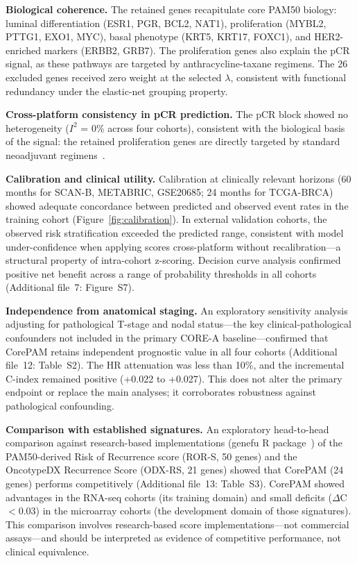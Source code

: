 \documentclass[referee,lineno,pdflatex,sn-vancouver-num]{sn-jnl}
\begin{document}
\textbf{Biological coherence.} The retained genes recapitulate core PAM50 biology: luminal differentiation (ESR1, PGR, BCL2, NAT1), proliferation (MYBL2, PTTG1, EXO1, MYC), basal phenotype (KRT5, KRT17, FOXC1), and HER2-enriched markers (ERBB2, GRB7). The proliferation genes also explain the pCR signal, as these pathways are targeted by anthracycline-taxane regimens. The 26 excluded genes received zero weight at the selected $\lambda$, consistent with functional redundancy under the elastic-net grouping property.

\textbf{Cross-platform consistency in pCR prediction.} The pCR block showed no heterogeneity ($I^2$ = 0\% across four cohorts), consistent with the biological basis of the signal: the retained proliferation genes are directly targeted by standard neoadjuvant regimens~\cite{prat2015}.

\textbf{Calibration and clinical utility.} Calibration at clinically relevant horizons (60 months for SCAN-B, METABRIC, GSE20685; 24 months for TCGA-BRCA) showed adequate concordance between predicted and observed event rates in the training cohort (Figure~\ref{fig:calibration}). In external validation cohorts, the observed risk stratification exceeded the predicted range, consistent with model under-confidence when applying scores cross-platform without recalibration---a structural property of intra-cohort z-scoring. Decision curve analysis confirmed positive net benefit across a range of probability thresholds in all cohorts (Additional file~7: Figure~S7).

\textbf{Independence from anatomical staging.} An exploratory sensitivity analysis adjusting for pathological T-stage and nodal status---the key clinical-pathological confounders not included in the primary CORE-A baseline---confirmed that CorePAM retains independent prognostic value in all four cohorts (Additional file~12: Table~S2). The HR attenuation was less than 10\%, and the incremental C-index remained positive (+0.022 to +0.027). This does not alter the primary endpoint or replace the main analyses; it corroborates robustness against pathological confounding.

\textbf{Comparison with established signatures.} An exploratory head-to-head comparison against research-based implementations (genefu R package~\cite{gendoo2016}) of the PAM50-derived Risk of Recurrence score (ROR-S, 50 genes) and the OncotypeDX Recurrence Score (ODX-RS, 21 genes) showed that CorePAM (24 genes) performs competitively (Additional file~13: Table~S3). CorePAM showed advantages in the RNA-seq cohorts (its training domain) and small deficits ($\Delta$C $< 0.03$) in the microarray cohorts (the development domain of those signatures). This comparison involves research-based score implementations---not commercial assays---and should be interpreted as evidence of competitive performance, not clinical equivalence.
\end{document}
